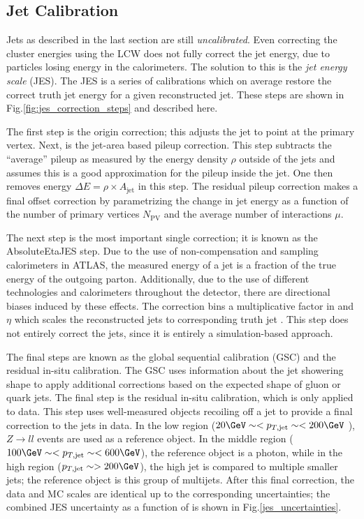 \subsection{Jet Calibration}

Jets as described in the last section are still \textit{uncalibrated}.
Even correcting the cluster energies using the LCW does not fully correct the jet energy, due to particles losing energy in the calorimeters.
The solution to this is the \textit{jet energy scale} (JES).
The JES is a series of calibrations which on average restore the correct truth jet energy for a given reconstructed jet.
These steps are shown in Fig.\ref{fig:jes_correction_steps} and described here.

The first step is the origin correction; this adjusts the jet to point at the primary vertex.
Next, is the jet-area based pileup correction.
This step subtracts the ``average'' pileup as measured by the energy density $\rho$ outside of the jets and assumes this is a good approximation for the pileup inside the jet.
One then removes energy $\Delta E = \rho \times A_{\text{jet}}$ in this step.
The residual pileup correction makes a final offset correction by parametrizing the change in jet energy as a function of the number of primary vertices $N_{\text{PV}}$ and the average number of interactions $\mu.$

The next step is the most important single correction; it is known as the AbsoluteEtaJES step.
Due to the use of non-compensation and sampling calorimeters in ATLAS, the measured energy of a jet is a fraction of the true energy of the outgoing parton.
Additionally, due to the use of different technologies and calorimeters throughout the detector, there are directional biases induced by these effects.
The correction bins a multiplicative factor in \pt and $\eta$ which scales the reconstructed jets to corresponding truth jet \pt.
This step does not entirely correct the jets, since it is entirely a simulation-based approach.

The final steps are known as the global sequential calibration (GSC) and the residual in-situ calibration.
The GSC uses information about the jet showering shape to apply additional corrections based on the expected shape of gluon or quark jets.
The final step is the residual in-situ calibration, which is only applied to data.
This step uses well-measured objects recoiling off a jet to provide a final correction to the jets in data.
In the low \pt region ($20 \GeV \order< p_{T,\text{jet}}  \order < 200 \GeV $ ), $Z \rightarrow ll$ events are used as a reference object.
In the middle \pt region ($100 \GeV \order< p_{T,\text{jet}}  \order< 600 \GeV $), the reference object is a photon, while in the high \pt region ($p_{T,\text{jet}} \order> 200 \GeV $), the high \pt jet is compared to multiple smaller \pt jets; the reference object is this group of multijets.
After this final correction, the data and MC scales are identical up to the corresponding uncertainties; the combined JES uncertainty as a function of \pt is shown in Fig.\ref{jes_uncertainties}.


